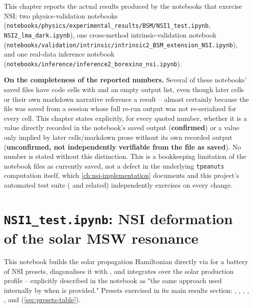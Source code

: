 \label{ch:nsi-results}

This chapter reports the actual results produced by the notebooks that
exercise NSI: two physics-validation notebooks
(\texttt{notebooks/physics/experimental\_results/BSM/NSI1\_test.ipynb},
\texttt{NSI2\_lma\_dark.ipynb}), one cross-method intrinsic-validation
notebook (\texttt{notebooks/validation/intrinsic/intrinsic2\_BSM\_extension\_NSI.ipynb}),
and one real-data inference notebook
(\texttt{notebooks/inference/inference2\_borexino\_nsi.ipynb}).

\begin{notebox}
\textbf{On the completeness of the reported numbers.} Several of these
notebooks' saved  files have code cells with
 and an empty output list, even though later
cells or their own markdown narrative reference a result -- almost
certainly because the file was saved from a session whose full re-run
output was not re-serialized for every cell. This chapter states explicitly,
for every quoted number, whether it is a value directly recorded in the
notebook's saved output (\textbf{confirmed}) or a value only implied by
later cells/markdown prose without its own recorded output
(\textbf{unconfirmed, not independently verifiable from the file as saved}).
No number is stated without this distinction. This is a bookkeeping
limitation of the notebook files as currently saved, not a defect in the
underlying \texttt{tpeanuts} computation itself, which \cref{ch:nsi-implementation}
documents and this project's automated test suite (
and related) independently exercises on every change.
\end{notebox}

\section{\texttt{NSI1\_test.ipynb}: NSI deformation of the solar MSW resonance}

\begin{implbox}
This notebook builds the solar propagation Hamiltonian directly via
 for a battery of NSI presets, diagonalises it
with , and integrates over the solar production
profile -- explicitly described in the notebook as "the same approach used
internally by  when  is
provided." Presets exercised in its main results section: ,
, ,
, , and
 (\cref{sec:presets-table}).
\end{implbox}

